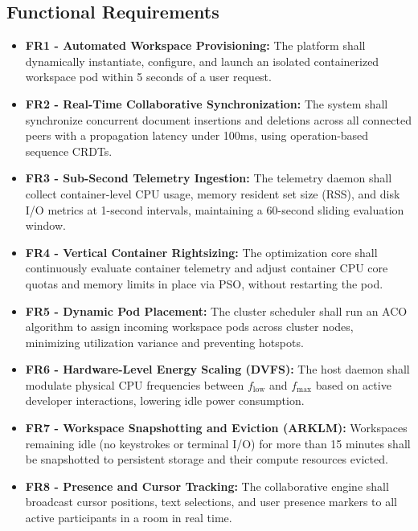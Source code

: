 \documentclass[12pt,a4paper]{report}
\begin{document}
	\subsection{Functional Requirements}
	\begin{itemize}
		\item \textbf{FR1 - Automated Workspace Provisioning:} The platform shall dynamically instantiate, configure, and launch an isolated containerized workspace pod within 5 seconds of a user request.
		\item \textbf{FR2 - Real-Time Collaborative Synchronization:} The system shall synchronize concurrent document insertions and deletions across all connected peers with a propagation latency under 100ms, using operation-based sequence CRDTs.
		\item \textbf{FR3 - Sub-Second Telemetry Ingestion:} The telemetry daemon shall collect container-level CPU usage, memory resident set size (RSS), and disk I/O metrics at 1-second intervals, maintaining a 60-second sliding evaluation window.
		\item \textbf{FR4 - Vertical Container Rightsizing:} The optimization core shall continuously evaluate container telemetry and adjust container CPU core quotas and memory limits in place via PSO, without restarting the pod.
		\item \textbf{FR5 - Dynamic Pod Placement:} The cluster scheduler shall run an ACO algorithm to assign incoming workspace pods across cluster nodes, minimizing utilization variance and preventing hotspots.
		\item \textbf{FR6 - Hardware-Level Energy Scaling (DVFS):} The host daemon shall modulate physical CPU frequencies between $f_{\text{low}}$ and $f_{\max}$ based on active developer interactions, lowering idle power consumption.
		\item \textbf{FR7 - Workspace Snapshotting and Eviction (ARKLM):} Workspaces remaining idle (no keystrokes or terminal I/O) for more than 15 minutes shall be snapshotted to persistent storage and their compute resources evicted.
		\item \textbf{FR8 - Presence and Cursor Tracking:} The collaborative engine shall broadcast cursor positions, text selections, and user presence markers to all active participants in a room in real time.
	\end{itemize}
	
\end{document}
